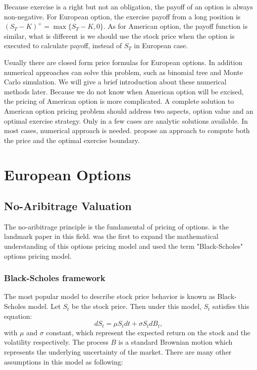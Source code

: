 \documentclass[12pt,oneside,titlepage]{book}
\begin{document}
Because exercise is a right but not an obligation, the payoff of an option is always non-negative. For European option, the exercise payoff from a long position is $(S_T - K)^+ = \max \{S_T-K,0\}$. As for American option, the payoff function is similar, what is different is we should use the stock price when the option is executed to calculate payoff, instead of $S_T$ in European case. 



Usually there are closed form price formulas for European options. In addition numerical approaches can solve this problem, such as binomial tree and Monte Carlo simulation. We will give a brief introduction about these numerical methods later. Because we do not know when American option will be excised, the pricing of American option is more complicated. A complete solution to American option pricing problem should address two aspects, option value and an optimal exercise strategy. Only in a few cases are analytic solutions available. In most cases, numerical approach is needed. \cite{Lim2004} propose an approach to compute both the price and the optimal exercise boundary.


\section{European Options}
\subsection{No-Aribitrage Valuation}

The no-aribitrage principle is the fundamental of pricing of options. \citet*{Black:1973} is the landmark paper in this field. \citet*{merton1973} was the first to expand the mathematical understanding of this options pricing model and used the term "Black-Scholes" options pricing model.

\subsubsection{Black-Scholes framework}
The most popular model to describe stock price behavior is known as Black-Scholes model.
Let $S_t$ be the stock price. Then under this model, $S_t$ satisfies this equation:
\begin{equation}\label{eq:1}
dS_t = \mu S_tdt + \sigma S_tdB_t,
\end{equation}
with $\mu$ and $\sigma $ constant,  which represent the expected return on the stock and the volatility respectively. The process $B$ is a standard Brownian motion which represents the underlying uncertainty of the market. There are many other assumptions in this model as following:
\end{document}
